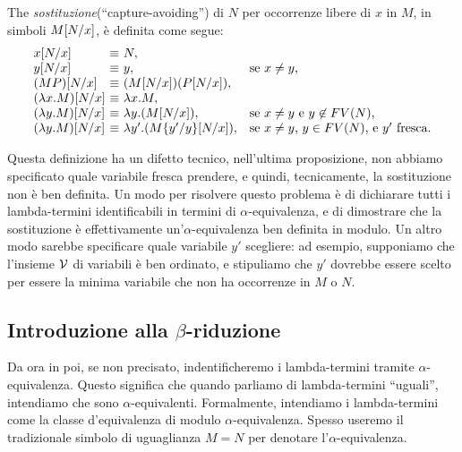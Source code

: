 \documentclass{article}
\begin{document}
\begin{definition}
  The {\em sostituzione}(``capture-avoiding'')  di $N$ per occorrenze
  libere di $x$ in $M$, in simboli $M[N/x]$, \`e definita
  come segue:
  \[  \begin{array}{l@{~}l@{~}ll}
    \subst{x}{N}{x} &\equiv & N, \\
    \subst{y}{N}{x} &\equiv & y, &\mbox{se $x\neq y$,} \\
    \subst{(MP)}{N}{x} &\equiv & (\subst{M}{N}{x})(\subst{P}{N}{x}), \\
    \subst{(\lam x.M)}{N}{x} &\equiv & \lam x.M, \\
    \subst{(\lam y.M)}{N}{x} &\equiv & \lam y.(\subst{M}{N}{x}), 
    &\mbox{se $x\neq y$ e $y\not\in\FV{N}$,} \\
    \subst{(\lam y.M)}{N}{x} &\equiv & \lam y'.(\subst{\ren{M}{y'}{y}}{N}{x}), 
    &\mbox{se $x\neq y$, $y\in\FV{N}$, e $y'$ fresca.} \\
  \end{array}
  \]
\end{definition}

Questa definizione ha un difetto tecnico, nell'ultima proposizione, non
abbiamo specificato quale variabile fresca prendere, e quindi, tecnicamente,
la sostituzione non \`e ben definita. Un modo per risolvere questo problema
\`e di dichiarare tutti i lambda-termini identificabili in termini di
$\alpha$-equivalenza, e di dimostrare che la sostituzione \`e effettivamente
un'$\alpha$-equivalenza ben definita in modulo. Un altro modo sarebbe
specificare quale variabile $y'$ scegliere: ad esempio, supponiamo che
l'insieme ${\cal V}$ di variabili \`e ben ordinato, e stipuliamo che $y'$ dovrebbe
essere scelto per essere la minima variabile che non ha occorrenze in $M$ o $N$.

\subsection{Introduzione alla $\beta$-riduzione}

\begin{convention}
Da ora in poi, se non precisato, indentificheremo i lambda-termini tramite
$\alpha$-equivalenza. Questo significa che quando parliamo di lambda-termini
``uguali'', intendiamo che sono $\alpha$-equivalenti. Formalmente, intendiamo
i lambda-termini come la classe d'equivalenza di modulo $\alpha$-equivalenza.
Spesso useremo il tradizionale simbolo di uguaglianza $M=N$ per denotare
l'$\alpha$-equivalenza.
\end{convention}
\end{document}
